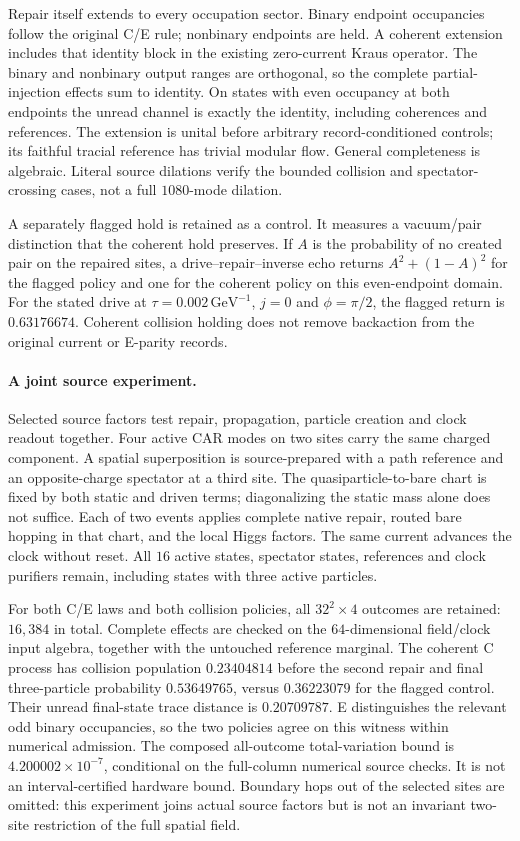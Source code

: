 Repair itself extends to every occupation sector. Binary endpoint
occupancies follow the original C/E rule; nonbinary endpoints are held.
A coherent extension includes that identity block in the existing
zero-current Kraus operator. The binary and nonbinary output ranges are
orthogonal, so the complete partial-injection effects sum to
identity. On states with even occupancy at both endpoints the unread
channel is exactly the identity, including coherences and references.
The extension is unital before arbitrary record-conditioned controls;
its faithful tracial reference has trivial modular flow. General
completeness is algebraic. Literal source dilations verify the bounded
collision and spectator-crossing cases, not a full $1080$-mode dilation.

A separately flagged hold is retained as a control. It measures a
vacuum/pair distinction that the coherent hold preserves. If $A$ is the
probability of no created pair on the repaired sites, a drive--repair--inverse
echo returns $A^2+(1-A)^2$ for the flagged policy and one for the coherent
policy on this even-endpoint domain. For the stated drive at
$\tau=0.002\,\mathrm{GeV}^{-1}$, $j=0$ and $\phi=\pi/2$, the flagged
return is $0.63176674$. Coherent collision holding does not remove
backaction from the original current or E-parity records.

\paragraph{A joint source experiment.}
Selected source factors test repair, propagation, particle creation
and clock readout together. Four active CAR modes on two sites carry the
same charged component. A spatial superposition is source-prepared with
a path reference and an opposite-charge spectator at a third site.
The quasiparticle-to-bare chart is fixed by both static and driven terms;
diagonalizing the static mass alone does not suffice. Each of two events
applies complete native repair, routed bare hopping in that chart, and
the local Higgs factors. The same current advances the clock without reset.
All $16$ active states, spectator states, references and clock purifiers
remain, including states with three active particles.

For both C/E laws and both collision policies, all $32^2\times4$ outcomes
are retained: $16{,}384$ in total. Complete effects are checked on the
$64$-dimensional field/clock input algebra, together with the untouched
reference marginal. The coherent C process has collision population
$0.23404814$ before the second repair and final three-particle probability
$0.53649765$, versus $0.36223079$ for the flagged control. Their unread
final-state trace distance is $0.20709787$. E distinguishes the
relevant odd binary occupancies, so the two policies agree on this
witness within numerical admission. The composed all-outcome
total-variation bound is $4.200002\times10^{-7}$, conditional on the
full-column numerical source checks. It is not an interval-certified
hardware bound. Boundary hops out of the selected sites are omitted:
this experiment joins actual source factors but is not an invariant
two-site restriction of the full spatial field.

